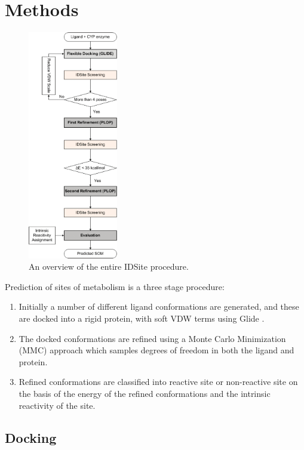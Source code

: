 \section{Methods}
\label{section:p450/methods}

\begin{figure}[h]
\centering
\includegraphics[width=0.35\textwidth]{figures/idsite/idsite_figure-000.png}
\caption{An overview of the entire IDSite procedure.}
\label{fig:idsite_overview}
\end{figure}

Prediction of sites of metabolism is a three stage procedure:
\begin{enumerate}
\item Initially a number of different ligand conformations are generated, and these are docked into a rigid protein, with soft VDW terms using Glide \cite{halgren2004glide,friesner2004glide}.
\item The docked conformations are refined using a Monte Carlo Minimization (MMC) approach which samples degrees of freedom in both the ligand and protein.
\item Refined conformations are classified into reactive site or non-reactive site on the basis of the energy of the refined conformations and the intrinsic reactivity of the site. \cite{li2011idsite}
\end{enumerate}

\subsection{Docking}
\label{subsection:p450/docking}


